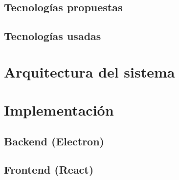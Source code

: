 \subsection{Tecnologías propuestas}
\subsection{Tecnologías usadas}
\section{Arquitectura del sistema}

\label{sec:arquitectura_del_sistema}

\section{Implementación}

\subsection{Backend (Electron)}
\subsection{Frontend (React)}
